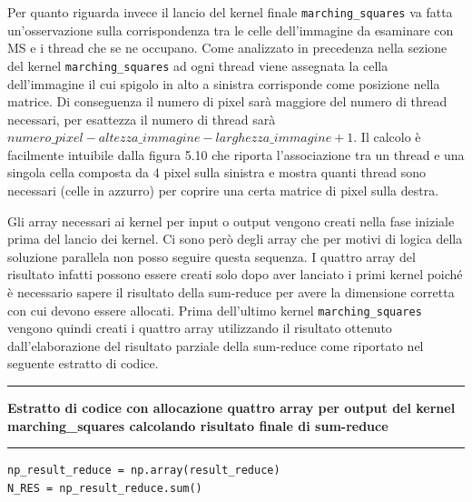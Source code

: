\documentclass[12pt,a4paper]{report}
\begin{document}
{\newpage
Per quanto riguarda invece il lancio del kernel finale \verb|marching_squares| va fatta un'osservazione sulla corrispondenza tra le celle dell'immagine da esaminare con MS e i thread che se ne occupano. Come analizzato in precedenza nella sezione del kernel \verb|marching_squares| ad ogni thread viene assegnata la cella dell'immagine il cui spigolo in alto a sinistra corrisponde come posizione nella matrice. Di conseguenza il numero di pixel sarà maggiore del numero di thread necessari, per esattezza il numero di thread sarà $numero\_pixel - altezza\_immagine - larghezza\_immagine + 1$. Il calcolo è facilmente intuibile dalla figura 5.10 che riporta l'associazione tra un thread e una singola cella composta da 4 pixel sulla sinistra e mostra quanti thread sono necessari (celle in azzurro) per coprire una certa matrice di pixel sulla destra.

\begin{figure}[H]
\centering
\begin{floatrow}[1]
\end{floatrow}
\end{figure} 
\newpage
Gli array necessari ai kernel per input o output vengono creati nella fase iniziale prima del lancio dei kernel. Ci sono però degli array che per motivi di logica della soluzione parallela non posso seguire questa sequenza. I quattro array del risultato infatti possono essere creati solo dopo aver lanciato i primi kernel poiché è necessario sapere il risultato della sum-reduce per avere la dimensione corretta con cui devono essere allocati.
Prima dell'ultimo kernel \verb|marching_squares| vengono quindi creati i quattro array utilizzando il risultato ottenuto dall'elaborazione del risultato parziale della sum-reduce come riportato nel seguente estratto di codice. \\
\noindent\rule[0.5ex]{\linewidth}{2pt}
\small{\textbf{Estratto di codice con allocazione quattro array per output del kernel marching\_squares calcolando risultato finale di sum-reduce}} \\
\noindent\rule[0.5ex]{\linewidth}{1pt}
\begin{lstlisting}
np_result_reduce = np.array(result_reduce) 
N_RES = np_result_reduce.sum() 


\end{lstlisting}}
\end{document}
